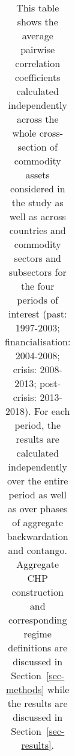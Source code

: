 \documentclass[
  authoryear,
  preprint,
  3p]{elsarticle}
\begin{document}
\newpage

\begingroup\fontsize{7}{9}\selectfont

\begin{longtable}[t]{>{}l>{}l>{}l>{}r>{}r>{}r>{}r>{}r}

\caption{\label{tbl-correlations-periods}This table shows the average
pairwise correlation coefficients calculated independently across the
whole cross-section of commodity assets considered in the study as well
as across countries and commodity sectors and subsectors for the four
periods of interest (past: 1997-2003; financialisation: 2004-2008;
crisis: 2008-2013; post-crisis: 2013-2018). For each period, the results
are calculated independently over the entire period as well as over
phases of aggregate backwardation and contango. Aggregate CHP
construction and corresponding regime definitions are discussed in
Section~\ref{sec-methods} while the results are discussed in
Section~\ref{sec-results}.}

\tabularnewline


\end{longtable}
\end{document}
